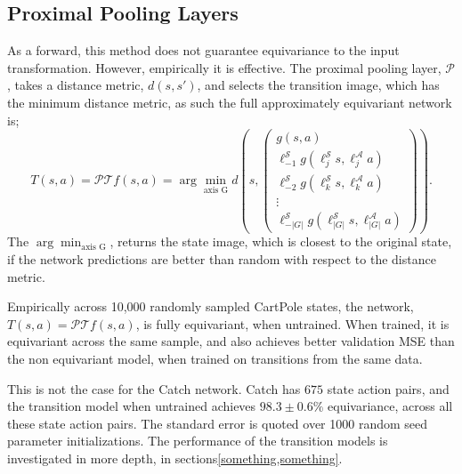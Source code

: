 \subsection{Proximal Pooling Layers}\label{sec:proximal_pool}
As a forward, this method does not guarantee equivariance to the input transformation. However, empirically it is effective.
The proximal pooling layer, $\mathcal{P}$, takes a distance metric, $d(s, s')$, and selects the transition image, which has the minimum distance metric, as such the full approximately equivariant network is;
\begin{equation}
	T(s, a) = \mathcal{P}\mathcal{T}f(s, a)  =\arg \min_\text{axis G} d \left (s,  \begin{pmatrix}
			g(s, a)                                                          \\
			\ell_{-1}^\mathcal{S}g(\ell_j^\mathcal{S}s,\ell^\mathcal{A}_ja)  \\
			\ell_{-2}^\mathcal{S}g(\ell^\mathcal{S}_ks, \ell^\mathcal{A}_ka) \\
			\vdots                                                           \\
			\ell_{-|G|}^\mathcal{S}g(\ell_{|G|}^\mathcal{S}s, \ell^\mathcal{A}_{|G|}a)
		\end{pmatrix}
	\right ).
\end{equation}
The $\arg \min_\text{axis G}$, returns the state image, which is closest to the original state, if the network predictions are better than random with respect to the distance metric.

Empirically across 10,000 randomly sampled CartPole states, the network, $T(s, a)= \mathcal{P}\mathcal{T}f(s,a)$, is fully equivariant, when untrained. When trained, it is equivariant across the same sample, and also achieves better validation MSE than the non equivariant model, when trained on transitions from the same data.

This is not the case for the Catch network. Catch has $675$ state action pairs, and the transition model when untrained achieves $98.3 \pm 0.6\%$ equivariance, across all these state action pairs. The standard error is quoted over 1000 random seed parameter initializations. The performance of the transition models is investigated in more depth, in sections\ref{something,something}.


